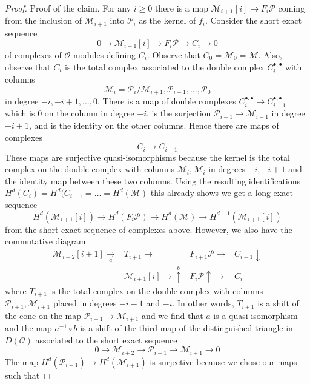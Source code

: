\begin{proof}
\medskip\noindent
Proof of the claim. For any $i \geq 0$ there is a map
$\mathcal{M}_{i + 1}[i] \to F_i\mathcal{P}$ coming from
the inclusion of $\mathcal{M}_{i + 1}$ into $\mathcal{P}_i$
as the kernel of $f_i$. Consider the short exact sequence
$$
0 \to \mathcal{M}_{i + 1}[i] \to F_i\mathcal{P} \to C_i \to 0
$$
of complexes of $\mathcal{O}$-modules defining $C_i$.
Observe that $C_0 = \mathcal{M}_0 = \mathcal{M}$.
Also, observe that $C_i$ is the total complex associated to the
double complex $C_i^{\bullet, \bullet}$ with columns
$$
\mathcal{M}_i = \mathcal{P}_i/\mathcal{M}_{i + 1},
\mathcal{P}_{i - 1}, \ldots, \mathcal{P}_0
$$
in degree $-i, -i + 1, \ldots, 0$. There is a map of double complexes
$C_i^{\bullet, \bullet} \to C_{i - 1}^{\bullet, \bullet}$ which is
$0$ on the column in degree $-i$, is the surjection
$\mathcal{P}_{i - 1} \to \mathcal{M}_{i - 1}$ in degree $-i + 1$,
and is the identity on the other columns.
Hence there are maps of complexes
$$
C_i \longrightarrow C_{i - 1}
$$
These maps are surjective quasi-isomorphisms because the kernel
is the total complex on the double complex with columns
$\mathcal{M}_i, \mathcal{M}_i$ in degrees $-i, -i + 1$ and
the identity map between these two columns. Using the
resulting identifications
$H^d(C_i) = H^d(C_{i - 1} = \ldots = H^d(\mathcal{M})$
this already shows we get a long exact sequence
$$
H^d(\mathcal{M}_{i + 1}[i]) \to
H^d(F_i\mathcal{P}) \to H^d(\mathcal{M}) \to
H^{d + 1}(\mathcal{M}_{i + 1}[i])
$$
from the short exact sequence of complexes above.
However, we also have the commutative diagram
$$
\begin{array}{cccc}\mathcal{M}_{i + 2}[i + 1] \underset{a}{\longrightarrow} & T_{i + 1} \longrightarrow & F_{i + 1}\mathcal{P} \longrightarrow & C_{i + 1} \downarrow \\  & \mathcal{M}_{i + 1}[i] \longrightarrow\overset{b}{\uparrow} & F_i\mathcal{P} \uparrow\longrightarrow & C_i\end{array}
$$
where $T_{i + 1}$ is the total complex on the double complex
with columns $\mathcal{P}_{i + 1}, \mathcal{M}_{i + 1}$ placed
in degrees $-i - 1$ and $-i$. In other words, $T_{i + 1}$ is
a shift of the cone on the map
$\mathcal{P}_{i + 1} \to \mathcal{M}_{i + 1}$ and we find that
$a$ is a quasi-isomorphism and the map $a^{-1} \circ b$ is a shift of the
third map of the distinguished triangle in $D(\mathcal{O})$ associated
to the short exact sequence
$$
0 \to \mathcal{M}_{i + 2} \to \mathcal{P}_{i + 1} \to \mathcal{M}_{i + 1} \to 0
$$
The map $H^d(\mathcal{P}_{i + 1}) \to H^d(\mathcal{M}_{i + 1})$
is surjective because we chose our maps such that

\end{proof}
